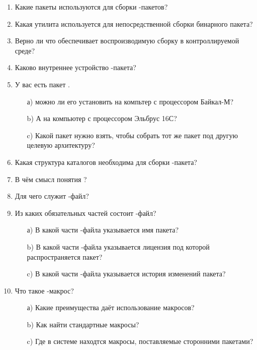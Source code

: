 \begin{enumerate}
\item Какие пакеты используются для сборки -пакетов?
\item Какая утилита используется для непосредственной сборки бинарного пакета?
\item Верно ли что  обеспечивает воспроизводимую сборку в контроллируемой среде?
\item Каково внутреннее устройство -пакета?
\item У вас есть пакет . 
	\begin{enumerate}
		\item[а)] можно ли его установить на компьтер с процессором Байкал-М? 
		\item[b)] А на компьютер с процессором Эльбрус 16С? 
		\item[c)] Какой пакет нужно взять, чтобы собрать тот же пакет под другую целевую архитектуру?
	\end{enumerate}
\item Какая структура каталогов необходима для сборки -пакета?
\item В чём смысл понятия ?
\item Для чего служит -файл?
\item Из каких обязательных частей состоит -файл?
	\begin{enumerate}
                \item[а)] В какой части -файла указывается имя пакета?
                \item[b)] В какой части -файла указывается лицензия под которой распространяется пакет?
                \item[c)] В какой части -файла указывается история изменений пакета?
        \end{enumerate}
\item Что такое -макрос?
	\begin{enumerate}
                \item[а)] Какие преимущества даёт использование макросов?
                \item[b)] Как найти стандартные макросы?
                \item[c)] Где в системе находтся макросы, поставляемые сторонними пакетами?
        \end{enumerate}
\end{enumerate}
